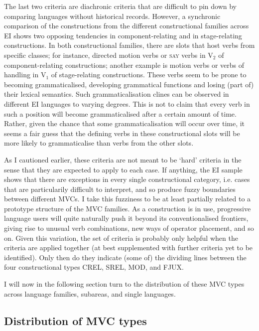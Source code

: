 The last two criteria are diachronic criteria that are difficult to pin down by comparing languages without historical records. However, a synchronic comparison of the constructions from the different constructional families across EI shows two opposing tendencies in component-relating and in stage-relating constructions. In both constructional families, there are slots that host verbs from specific classes; for instance, directed motion verbs or \textsc{say} verbs in V$_2$ of component-relating constructions; another example is motion verbs or verbs of handling in V$_1$ of stage-relating constructions. These verbs seem to be prone to becoming grammaticalised, developing grammatical functions and losing (part of) their lexical semantics. Such grammaticalisation clines can be observed in different EI languages to varying degrees. This is not to claim that every verb in such a position will become grammaticalised after a certain amount of time. Rather, given the chance that some grammaticalisation will occur over time, it seems a fair guess that the defining verbs in these constructional slots will be more likely to grammaticalise than verbs from the other slots.

As I cautioned earlier, these criteria are not meant to be `hard' criteria in the sense that they are expected to apply to each case. If anything, the EI sample shows that there are exceptions in every single constructional category, i.e. cases that are particularily difficult to interpret, and so produce fuzzy boundaries between different MVCs. I take this fuzziness to be at least partially related to a prototype structure of the MVC families. As a construction is in use, progressive language users will quite naturally push it beyond its conventionalised frontiers, giving rise to unusual verb combinations, new ways of operator placement, and so on. Given this variation, the set of criteria is probably only helpful when the criteria are applied together (at best supplemented with further criteria yet to be identified). Only then do they indicate (some of) the dividing lines between the four constructional types CREL, SREL, MOD, and FJUX. 

I will now in the following section turn to the distribution of these MVC types across language families, subareas, and single languages.

\subsection{Distribution of MVC types}\label{sec:dist_types}

